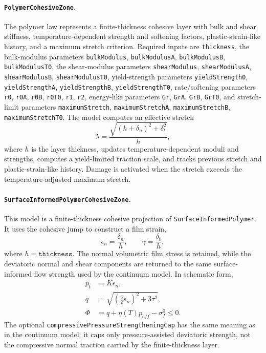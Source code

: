 \paragraph{\texttt{PolymerCohesiveZone}.}
The polymer law represents a finite-thickness cohesive layer with bulk and shear stiffness, temperature-dependent strength and softening factors, plastic-strain-like history, and a maximum stretch criterion.  Required inputs are \texttt{thickness}, the bulk-modulus parameters \texttt{bulkModulus}, \texttt{bulkModulusA}, \texttt{bulkModulusB}, \texttt{bulkModulusT0}, the shear-modulus parameters \texttt{shearModulus}, \texttt{shearModulusA}, \texttt{shearModulusB}, \texttt{shearModulusT0}, yield-strength parameters \texttt{yieldStrength0}, \texttt{yieldStrengthA}, \texttt{yieldStrengthB}, \texttt{yieldStrengthT0}, rate/softening parameters \texttt{r0}, \texttt{r0A}, \texttt{r0B}, \texttt{r0T0}, \texttt{r1}, \texttt{r2}, energy-like parameters \texttt{Gr}, \texttt{GrA}, \texttt{GrB}, \texttt{GrT0}, and stretch-limit parameters \texttt{maximumStretch}, \texttt{maximumStretchA}, \texttt{maximumStretchB}, \texttt{maximumStretchT0}.  The model computes an effective stretch
\begin{equation}
  \lambda = \frac{\sqrt{(h+\delta_n)^2+\delta_t^2}}{h},
  \label{eq:cz-polymer-stretch}
\end{equation}
where $h$ is the layer thickness, updates temperature-dependent moduli and strengths, computes a yield-limited traction scale, and tracks previous stretch and plastic-strain-like history.  Damage is activated when the stretch exceeds the temperature-adjusted maximum stretch.

\paragraph{\texttt{SurfaceInformedPolymerCohesiveZone}.}
This model is a finite-thickness cohesive projection of \texttt{SurfaceInformedPolymer}.  It uses the cohesive jump to construct a film strain,
\begin{equation}
  \epsilon_n=\frac{\delta_n}{h},
  \qquad
  \gamma=\frac{\delta_t}{h},
  \label{eq:surface-polymer-cz-film-strain}
\end{equation}
where \(h=\texttt{thickness}\).  The normal volumetric film stress is retained, while the deviatoric normal and shear components are returned to the same surface-informed flow strength used by the continuum model.  In schematic form,
\begin{align}
  p_t &= K\epsilon_n,\\
  q &= \sqrt{\left(\frac{3}{2}s_n\right)^2+3\tau^2},\\
  \Phi &= q+\eta(T)p_{eff}-\sigma_f^0\le 0.
  \label{eq:surface-polymer-cz-yield}
\end{align}
The optional \texttt{compressivePressureStrengtheningCap} has the same meaning as in the continuum model: it caps only pressure-assisted deviatoric strength, not the compressive normal traction carried by the finite-thickness layer.

